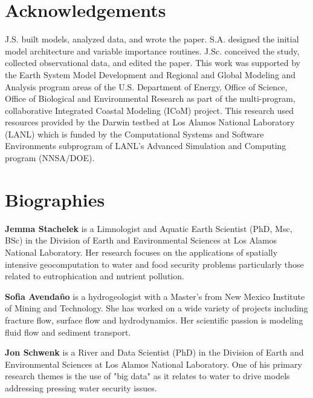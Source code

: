 \documentclass{article}
\begin{document}
\FloatBarrier

\section{Acknowledgements}

J.S. built models, analyzed data, and wrote the paper. S.A. designed the initial model architecture and variable importance routines. J.Sc. conceived the study, collected observational data, and edited the paper. This work was supported by the Earth System Model Development and Regional and Global Modeling and Analysis program areas of the U.S. Department of Energy, Office of Science, Office of Biological and Environmental Research as part of the multi-program, collaborative Integrated Coastal Modeling (ICoM) project. This research used resources provided by the Darwin testbed at Los Alamos National Laboratory (LANL) which is funded by the Computational Systems and Software Environments subprogram of LANL's Advanced Simulation and Computing program (NNSA/DOE).

% 
% 
\printbibliography

\section*{Biographies}

\begin{description}
    \item \textbf{Jemma Stachelek} is a Limnologist and Aquatic Earth Scientist (PhD, Msc, BSc) in the Division of Earth and Environmental Sciences at Los Alamos National Laboratory. Her research focuses on the applications of spatially intensive geocomputation to water and food security problems particularly those related to eutrophication and nutrient pollution.
    \item \textbf{Sofia Avendaño} is a hydrogeologist with a Master's from New Mexico Institute of Mining and Technology. She has worked on a wide variety of projects including fracture flow, surface flow and hydrodynamics. Her scientific passion is modeling fluid flow and sediment transport.
    \item \textbf{Jon Schwenk} is a River and Data Scientist (PhD) in the Division of Earth and Environmental Sciences at Los Alamos National Laboratory. One of his primary research themes is the use of "big data" as it relates to water to drive models addressing pressing water security issues.    
\end{description}
\end{document}
